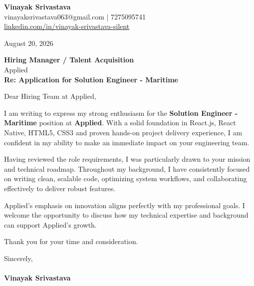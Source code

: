 \documentclass[11pt,a4paper]{article}
\begin{document}
\thispagestyle{empty}

{\Large \textbf{Vinayak Srivastava}}\\
vinayaksrivastava063@gmail.com | 7275095741 \\
\url{linkedin.com/in/vinayak-srivastava-silent}

\vspace{1em}
\hfill August 20, 2026

\textbf{Hiring Manager / Talent Acquisition}\\
Applied\\

\vspace{1.5em}
\textbf{Re: Application for Solution Engineer - Maritime}

\vspace{1em}
Dear Hiring Team at Applied,

I am writing to express my strong enthusiasm for the \textbf{Solution Engineer - Maritime} position at \textbf{Applied}. With a solid foundation in React.js, React Native, HTML5, CSS3 and proven hands-on project delivery experience, I am confident in my ability to make an immediate impact on your engineering team.

Having reviewed the role requirements, I was particularly drawn to your mission and technical roadmap. Throughout my background, I have consistently focused on writing clean, scalable code, optimizing system workflows, and collaborating effectively to deliver robust features.

Applied's emphasis on innovation aligns perfectly with my professional goals. I welcome the opportunity to discuss how my technical expertise and background can support Applied's growth.

Thank you for your time and consideration.

\vspace{1.5em}
Sincerely,\\
\vspace{1em}\\
\textbf{Vinayak Srivastava}
\end{document}
